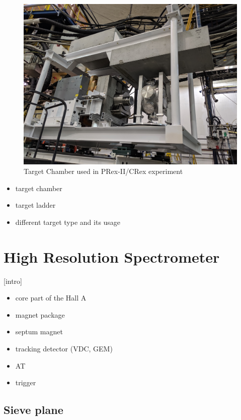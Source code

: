 \begin{figure}[!htbp]
    \centering
    \includegraphics[width=\textwidth]{images/chap3/target_chamber.jpg}
    \caption{Target Chamber used in PRex-II/CRex experiment}
    \label{fig:target_chamber_photo}
\end{figure}

\begin{itemize}
    \item target chamber
    \item target ladder 
    \item different target type and its usage
\end{itemize}

\section{High Resolution Spectrometer}

[intro]

\begin{itemize}
    \item core part of the Hall A 
    \item magnet package
    \item septum magnet
    \item tracking detector (VDC, GEM)
    \item AT
    \item trigger
\end{itemize}

\subsection{Sieve plane}

